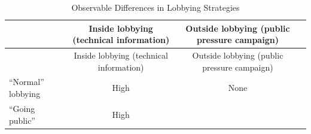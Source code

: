 \documentclass[
      12pt,
        ]{article}
\begin{document}
\begin{longtable}[]{@{}lccc@{}}
\caption{\label{tab:campaigns-patterns} Observable Differences in Lobbying Strategies}\tabularnewline
\toprule
\begin{minipage}[b]{0.19\columnwidth}\raggedright
\strut
\end{minipage} & \begin{minipage}[b]{0.23\columnwidth}\centering
Inside lobbying (technical information)\strut
\end{minipage} & \begin{minipage}[b]{0.23\columnwidth}\centering
Outside lobbying (public pressure campaign)\strut
\end{minipage} & \begin{minipage}[b]{0.23\columnwidth}\centering
\strut
\end{minipage}\tabularnewline
\midrule
\endfirsthead
\toprule
\begin{minipage}[b]{0.19\columnwidth}\raggedright
\strut
\end{minipage} & \begin{minipage}[b]{0.23\columnwidth}\centering
Inside lobbying (technical information)\strut
\end{minipage} & \begin{minipage}[b]{0.23\columnwidth}\centering
Outside lobbying (public pressure campaign)\strut
\end{minipage} & \begin{minipage}[b]{0.23\columnwidth}\centering
\strut
\end{minipage}\tabularnewline
\midrule
\endhead
\begin{minipage}[t]{0.19\columnwidth}\raggedright
``Normal'' lobbying\strut
\end{minipage} & \begin{minipage}[t]{0.23\columnwidth}\centering
High\strut
\end{minipage} & \begin{minipage}[t]{0.23\columnwidth}\centering
None\strut
\end{minipage} & \begin{minipage}[t]{0.23\columnwidth}\centering
\strut
\end{minipage}\tabularnewline
\begin{minipage}[t]{0.19\columnwidth}\raggedright
``Going public''\strut
\end{minipage} & \begin{minipage}[t]{0.23\columnwidth}\centering
High\strut
\end{minipage} & \begin{minipage}[t]{0.23\columnwidth}\centering

\end{minipage}
\end{longtable}
\end{document}
